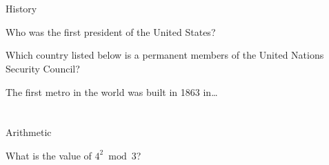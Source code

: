 \documentclass{../cie}
\begin{document}
  \section{}{History}

  \begin{question}%
    Who was the first president of the United States?

    \setanswer
  \end{question}

  \begin{question}%
    Which country listed below is a permanent members of the United Nations Security Council?

    \setanswer
  \end{question}

  \begin{question}%
    The first metro in the world was built in 1863 in\ldots

    \setanswer
  \end{question}

  \section{}{Arithmetic}

  \begin{question}%
    What is the value of $4^2 \bmod 3$?

    \setanswer
  \end{question}

  \finalstuff
\end{document}
